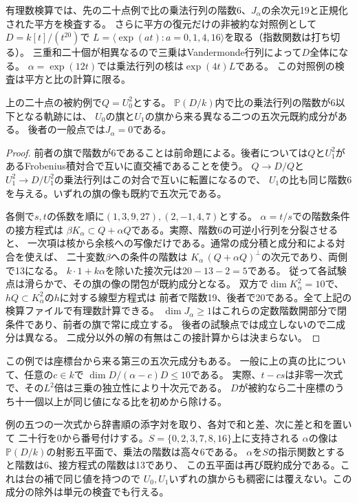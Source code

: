 有理数検算では、先の二十点例で比の乗法行列の階数6、$J_\alpha$の余次元19と正規化された平方を検査する。
さらに平方の復元だけの非被約な対照例として$D=k[t]/(t^{20})$で
$L=\langle\exp(at):a=0,1,4,16\rangle$を取る（指数関数は打ち切る）。
三重和二十個が相異なるので三乗はVandermonde行列によって$D$全体になる。
$\alpha=\exp(12t)$では乗法行列の核は$\exp(4t)L$である。
この対照例の検査は平方と比の計算に限る。

\begin{proposition}[比の階数条件に含まれる二つの成分]\label{prop:finite-ratio-components}
上の二十点の被約例で$Q=U_0^2$とする。
$\mathbb P(D/k)$内で比の乗法行列の階数が6以下となる軌跡には、
$U_0$の旗と$U_1$の旗から来る異なる二つの五次元既約成分がある。
後者の一般点では$J_\alpha=0$である。
\end{proposition}
\begin{proof}
前者の旗で階数が6であることは前命題による。後者については$Q$と$U_1^2$が
あるFrobenius積対合で互いに直交補であることを使う。
$Q\to D/Q$と$U_1^2\to D/U_1^2$の乗法行列はこの対合で互いに転置になるので、
$U_1$の比も同じ階数6を与える。いずれの旗の像も既約で五次元である。

各側で$s,t$の係数を順に$(1,3,9,27),(2,-1,4,7)$とする。
$\alpha=t/s$での階数条件の接方程式は
$\beta K_\alpha\subset Q+\alpha Q$である。実際、階数6の可逆小行列を分裂させると、
一次項は核から余核への写像だけである。通常の成分積と成分和による対合を使えば、
二十変数$\beta$への条件の階数は
$K_\alpha\,(Q+\alpha Q)^\perp$の次元であり、両側で13になる。
$k\cdot1+k\alpha$を除いた接次元は$20-13-2=5$である。
従って各試験点は滑らかで、その旗の像の閉包が既約成分となる。
双方で$\dim K_\alpha^2=10$で、$hQ\subset K_\alpha^2$の$h$に対する線型方程式は
前者で階数19、後者で20である。全て上記の検算ファイルで有理数計算できる。
$\dim J_\alpha\ge1$はこれらの定数階数開部分で閉条件であり、前者の旗で常に成立する。
後者の試験点では成立しないので二成分は異なる。
二成分以外の解の有無はこの接計算からは決まらない。
\end{proof}

この例では座標台から来る第三の五次元成分もある。
一般に上の真の比について、任意の$c\in k$で
$\dim D/(\alpha-c)D\le10$である。
実際、$t-cs$は非零一次式で、その$L^2$倍は三乗の独立性により十次元である。
$D$が被約なら二十座標のうち十一個以上が同じ値になる比を初めから除ける。

例の五つの一次式から辞書順の添字対を取り、各対で和と差、次に差と和を置いて
二十行を0から番号付けする。$S=\{0,2,3,7,8,16\}$上に支持される
$\alpha$の像は$\mathbb P(D/k)$の射影五平面で、乗法の階数は高々6である。
$\alpha$を$S$の指示関数とすると階数は6、接方程式の階数は13であり、
この五平面は再び既約成分である。これは台の補で同じ値を持つので
$U_0,U_1$いずれの旗からも稠密には覆えない。この成分の除外は単元の検査でも行える。
